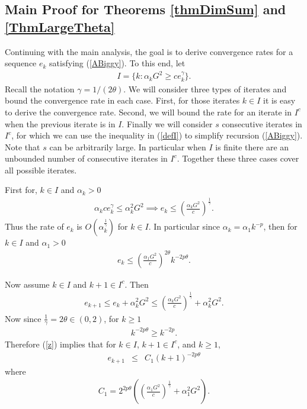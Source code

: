 \subsection{Main Proof for Theorems \ref{thmDimSum} and \ref{ThmLargeTheta}}
Continuing with the main analysis, the goal is to derive convergence rates for a sequence $e_k$ satisfying (\ref{ABiggy}). To this end, let
\begin{eqnarray}\label{defI}
I=\{k: \alpha_k G^2\geq  c e_k^\gamma\}.
\end{eqnarray}
Recall the notation $\gamma=1/(2\theta)$. 
We will consider three types of iterates and bound the convergence rate in each case. First, for those iterates $k\in I$ it is easy to derive the convergence rate. Second, we will bound the rate for an iterate in $I^c$ when the previous iterate is in $I$. Finally we will consider $s$ consecutive iterates in $I^c$, for which we can use the inequality in (\ref{defI}) to simplify recursion (\ref{ABiggy}). Note that $s$ can be arbitrarily large. In particular when $I$ is finite there are an unbounded number of consecutive iterates in $I^c$. Together these three cases cover all possible iterates. 

First for, $k\in I$ and $\alpha_k>0$
\begin{eqnarray*}
	\alpha_k c e_k^\gamma \leq \alpha_k^2 G^2\implies e_k\leq \left(\frac{\alpha_k G^2}{c}\right)^{\frac{1}{\gamma}}.
\end{eqnarray*}
Thus the rate of $e_k$ is $O\left(\alpha_k^{\frac{1}{\gamma}}\right)$ for $k\in I$. In particular since $\alpha_k=\alpha_1k^{-p}$, then for $k\in I$ and $\alpha_1>0$
\begin{eqnarray}\label{firstCase}
e_k\leq \left(\frac{\alpha_1 G^2}{c}\right)^{2\theta} k^{-2 p\theta}.
\end{eqnarray}

Now assume $k\in I$ and $k+1\in I^c$. Then
\begin{eqnarray}\label{z}
	e_{k+1}\leq e_k + \alpha_k^2 G^2 \leq \left(\frac{\alpha_k G^2}{c}\right)^{\frac{1}{\gamma}}+ \alpha_k^2 G^2.
\end{eqnarray}
Now since $\frac{1}{\gamma}=2\theta\in(0,2)$, for $k\geq 1$
\begin{eqnarray*}
k^{-2p\theta}\geq k^{-2p}.
\end{eqnarray*}
Therefore (\ref{z}) implies that for $k\in I$, $k+1\in I^c$, and $k\geq 1$,
\begin{eqnarray}\label{case3}\label{case33}
e_{k+1}
&\leq&
C_1(k+1)^{-2p\theta}
\end{eqnarray}
where
\begin{eqnarray*}
C_1 = 
2^{2p\theta}
\left(
\left(\frac{\alpha_1 G^2}{c}\right)^{\frac{1}{\gamma}}
+
\alpha_1^2 G^2
\right).
\end{eqnarray*}

